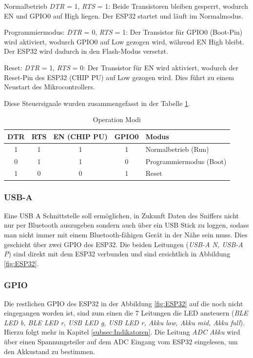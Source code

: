Normalbetrieb
\textit{DTR} = 1, \textit{RTS} = 1: Beide Transistoren bleiben gesperrt, wodurch EN und GPIO0 auf High liegen. Der ESP32 startet und läuft im Normalmodus.

Programmiermodus:
\textit{DTR} = 0, \textit{RTS} = 1: Der Transistor für GPIO0 (Boot-Pin) wird aktiviert, wodurch GPIO0 auf Low gezogen wird, während EN High bleibt. Der ESP32 wird dadurch in den Flash-Modus versetzt.

Reset:
\textit{DTR} = 1, \textit{RTS} = 0: Der Transistor für EN wird aktiviert, wodurch der Reset-Pin des ESP32 (CHIP PU) auf Low gezogen wird. Dies führt zu einem Neustart des Mikrocontrollers. 

Diese Steuersignale wurden  zusammengefasst in der Tabelle \ref{tab:operation_modes}.
\begin{table}[h]
  \centering
  \begin{tabular}{|c|c|c|c|l|}
    \hline
    DTR & RTS & EN (CHIP PU) & GPIO0 & Modus \\ \hline
    1   & 1   & 1            & 1     & Normalbetrieb (Run) \\ \hline
    0   & 1   & 1            & 0     & Programmiermodus (Boot) \\ \hline
    1   & 0   & 0            & 1     & Reset \\ \hline
  \end{tabular}
  \caption{Operation Modi}
  \label{tab:operation_modes}
\end{table}



\subsubsection{USB-A}
Eine USB A Schnittstelle soll ermöglichen, in Zukunft Daten des Sniffers nicht nur per Bluetooth auszugeben sondern auch über ein USB Stick zu loggen, sodass man nicht immer mit einem Bluetooth-fähigen Gerät in der Nähe sein muss. Dies geschieht über zwei GPIO des ESP32. Die beiden Leitungen (\textit{USB-A N, USB-A P}) sind direkt mit dem ESP32 verbunden und sind ersichtlich in Abbildung \ref{fig:ESP32}.

\subsubsection{GPIO}
 Die restlichen GPIO des ESP32 in der Abbildung \ref{fig:ESP32} auf die noch nicht eingegangen worden ist, sind zum einen die 7 Leitungen die LED ansteuern (\textit{BLE LED b, BLE LED r, USB LED g, USB LED r, Akku low, Akku mid, Akku full}). Hierzu folgt mehr in Kapitel \ref{subsec:Indikatoren}. Die Leitung \textit{ADC Akku} wird über einen Spannungsteiler auf dem ADC Eingang vom ESP32 eingelesen, um den Akkustand zu bestimmen.
 
